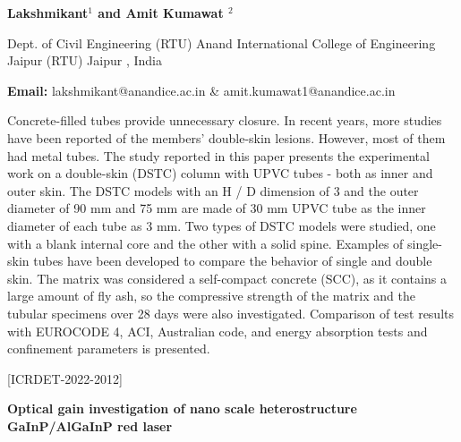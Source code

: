 \documentclass[twoside,11pt]{amsart}
\begin{document}
\centerline{\textbf{Lakshmikant$^{1}$ and Amit Kumawat
$^{2}$   }}
\vskip 5mm
\begin{flushleft}
Dept. of Civil Engineering (RTU) Anand International College of Engineering Jaipur (RTU) Jaipur , India
\vskip 5mm
\end{flushleft}
\vskip 2mm
\begin{flushleft}
{\bf Email:} lakshmikant@anandice.ac.in \& amit.kumawat1@anandice.ac.in
\end{flushleft}
\vskip 5mm
Concrete-filled tubes provide unnecessary closure. In recent years, more studies have been reported of the members' double-skin lesions. However, most of them had metal tubes. The study reported in this paper presents the experimental work on a double-skin (DSTC) column with UPVC tubes - both as inner and outer skin. The DSTC models with an H / D dimension of 3 and the outer diameter of 90 mm and 75 mm are made of 30 mm UPVC tube as the inner diameter of each tube as 3 mm. Two types of DSTC models were studied, one with a blank internal core and the other with a solid spine. Examples of single-skin tubes have been developed to compare the behavior of single and double skin. The matrix was considered a self-compact concrete (SCC), as it contains a large amount of fly ash, so the compressive strength of the matrix and the tubular specimens over 28 days were also investigated. Comparison of test results with EUROCODE 4, ACI, Australian code, and energy absorption tests and confinement parameters is presented.
\newpage
\vskip 5mm
\begin{flushleft}
\centerline{[ICRDET-2022-2012]}
\end{flushleft}
\begin{center}\bf\LARGE
Optical gain investigation of nano scale heterostructure GaInP/AlGaInP red laser
\end{center}
\vskip 5mm
\end{document}
